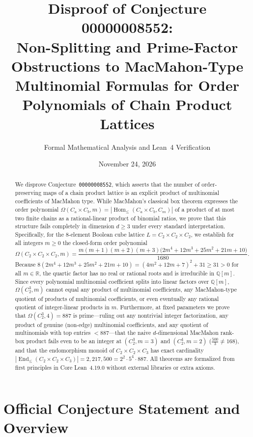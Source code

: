 \documentclass[11pt,a4paper]{article}
\title{\textbf{Disproof of Conjecture 00000008552:\\
Non-Splitting and Prime-Factor Obstructions to MacMahon-Type\\
Multinomial Formulas for Order Polynomials of Chain Product Lattices}}
\author{Formal Mathematical Analysis and Lean~4 Verification}
\date{November 24, 2026}
\theoremstyle{definition}
\newcommand{\Homle}{\operatorname{Hom}_{\le}}
\newcommand{\Endle}{\operatorname{End}_{\le}}
\begin{document}
\maketitle

\begin{abstract}
We disprove Conjecture~\texttt{00000008552}, which asserts that the number of order-preserving
maps of a chain product lattice is an explicit product of multinomial coefficients of MacMahon type.
While MacMahon's classical box theorem expresses the order polynomial $\Omega(C_a \times C_b, m)
= |\Homle(C_a \times C_b, C_m)|$ of a product of at most two finite chains as a rational-linear
product of binomial ratios, we prove that this structure fails completely in dimension $d \ge 3$
under every standard interpretation. Specifically, for the $8$-element Boolean cube lattice
$L = C_2 \times C_2 \times C_2$, we establish for all integers $m \ge 0$ the closed-form order
polynomial
\[
  \Omega(C_2 \times C_2 \times C_2, m)
  = \frac{m(m+1)(m+2)(m+3)\bigl(2m^4 + 12m^3 + 25m^2 + 21m + 10\bigr)}{1680}.
\]
Because $8(2m^4 + 12m^3 + 25m^2 + 21m + 10) = (4m^2 + 12m + 7)^2 + 31 \ge 31 > 0$ for all
$m \in \mathbb{R}$, the quartic factor has no real or rational roots and is irreducible in
$\mathbb{Q}[m]$. Since every polynomial multinomial coefficient splits into linear factors over
$\mathbb{Q}[m]$, $\Omega(C_2^3, m)$ cannot equal any product of multinomial coefficients, any
MacMahon-type quotient of products of multinomial coefficients, or even eventually any rational
quotient of integer-linear products in $m$. Furthermore, at fixed parameters we prove that
$\Omega(C_2^3, 4) = 887$ is prime---ruling out any nontrivial integer factorization, any product of
genuine (non-edge) multinomial coefficients, and any quotient of multinomials with top entries
$< 887$---that the naive $d$-dimensional MacMahon rank-box product fails even to be an integer at
$(C_2^3, m=3)$ and $(C_2^4, m=2)$ ($\frac{500}{3} \ne 168$), and that the endomorphism monoid of
$C_2 \times C_2 \times C_3$ has exact cardinality $|\Endle(C_2 \times C_2 \times C_3)| =
2{,}217{,}500 = 2^2 \cdot 5^4 \cdot 887$. All theorems are formalized from first principles in Core
Lean~4.19.0 without external libraries or extra axioms.
\end{abstract}

\section{Official Conjecture Statement and Overview}
\end{document}

